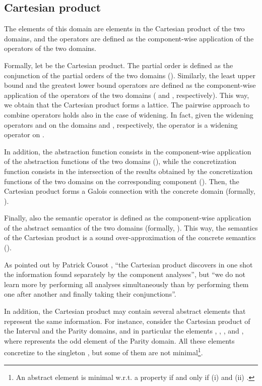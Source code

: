 \documentclass[submission,copyright,creativecommons]{eptcs}
\begin{document}
\subsection{Cartesian product}
The elements of this domain are elements in the Cartesian product of the two domains, and the operators are defined as the component-wise application of the operators of the two domains. 

Formally, let  be the Cartesian product. The partial order is defined as the conjunction of the partial orders of the two domains (). Similarly, the least upper bound and the greatest lower bound operators are defined as the component-wise application of the operators of the two domains ( and , respectively). This way, we obtain that the Cartesian product  forms a lattice. The pairwise approach to combine operators holds also in the case of widening. In fact, given  the widening operators  and  on the domains  and , respectively, the operator  is a widening operator on  \cite{ZanioliCortesi}.

In addition, the abstraction function  consists in the component-wise application of the abstraction functions of the two domains (), while the concretization function  consists in the intersection of the results obtained by the concretization functions of the two domains on the corresponding component (). Then, the Cartesian product forms a Galois connection with the concrete domain (formally, ).

Finally, also the semantic operator  is defined as the component-wise application of the abstract semantics of the two domains (formally, ). This way, the semantics of the Cartesian product is a sound over-approximation of the concrete semantics ().


As pointed out by Patrick Cousot \cite{MIT}, \textquotedblleft the Cartesian product discovers in one shot the information found separately by the component analyses\textquotedblright, but \textquotedblleft we do not learn more by performing all analyses simultaneously than by performing them one after another and finally taking their conjunctions\textquotedblright.

In addition, the Cartesian product may contain several abstract elements that represent the same information. For instance, consider the Cartesian product of the Interval and the Parity domains, and in particular the elements , , , and , where  represents the odd element of the Parity domain. All these elements concretize to the singleton , but some of them are not minimal\footnote{An abstract element  is minimal w.r.t. a property  if and only if (i)  and (ii) .}.
\end{document}
